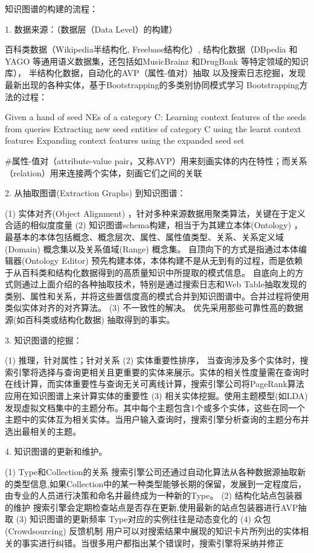 知识图谱的构建的流程：

1. 数据来源：（数据层（Data Level）的构建）

百科类数据（Wikipedia半结构化, Freebase结构化）,
结构化数据（DBpedia 和YAGO 等通用语义数据集，还包括如MusicBrainz 和DrugBank 等特定领域的知识库），
半结构化数据，自动化的AVP（属性-值对）抽取
以及搜索日志挖掘，发现最新出现的各种实体，基于Bootstrapping的多类别协同模式学习
      Bootstrapping方法的过程：

    Given a hand of seed NEs of a category C:
    Learning context features of the seeds from queries
    Extracting new seed entities of category C using the learnt context  features
    Expanding context features using the expanded seed set

\#属性-值对（attribute-value pair，又称AVP）用来刻画实体的内在特性；而关系（relation）用来连接两个实体，刻画它们之间的关联

2. 从抽取图谱(Extraction Graphs) 到知识图谱：

(1) 实体对齐(Object Alignment) ，针对多种来源数据用聚类算法，关键在于定义合适的相似度度量
(2) 知识图谱schema构建，相当于为其建立本体(Ontology) ，最基本的本体包括概念、概念层次、属性、属性值类型、关系、关系定义域(Domain) 概念集以及关系值域(Range) 概念集。
自顶向下的方式是指通过本体编辑器(Ontology Editor) 预先构建本体，本体构建不是从无到有的过程，而是依赖于从百科类和结构化数据得到的高质量知识中所提取的模式信息。
自底向上的方式则通过上面介绍的各种抽取技术，特别是通过搜索日志和Web Table抽取发现的类别、属性和关系，并将这些置信度高的模式合并到知识图谱中。合并过程将使用类似实体对齐的对齐算法。
(3) 不一致性的解决。
优先采用那些可靠性高的数据源(如百科类或结构化数据) 抽取得到的事实。

3. 知识图谱的挖掘：

(1) 推理，针对属性；针对关系
(2) 实体重要性排序，
当查询涉及多个实体时，搜索引擎将选择与查询更相关且更重要的实体来展示。实体的相关性度量需在查询时在线计算，而实体重要性与查询无关可离线计算，搜索引擎公司将PageRank算法 应用在知识图谱上来计算实体的重要性
(3) 相关实体挖掘。使用主题模型(如LDA) 发现虚拟文档集中的主题分布。其中每个主题包含1个或多个实体，这些在同一个主题中的实体互为相关实体。当用户输入查询时，搜索引擎分析查询的主题分布并选出最相关的主题。

4. 知识图谱的更新和维护。

(1) Type和Collection的关系
搜索引擎公司还通过自动化算法从各种数据源抽取新的类型信息,如果Collection中的某一种类型能够长期的保留，发展到一定程度后，由专业的人员进行决策和命名并最终成为一种新的Type。
(2) 结构化站点包装器的维护
搜索引擎会定期检查站点是否存在更新,使用最新的站点包装器进行AVP抽取
(3) 知识图谱的更新频率
Type对应的实例往往是动态变化的
(4) 众包(Crowdsourcing) 反馈机制
用户可以对搜索结果中展现的知识卡片所列出的实体相关的事实进行纠错。当很多用户都指出某个错误时，搜索引擎将采纳并修正


